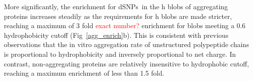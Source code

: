 \documentclass[10pt,letterpaper]{article}
\newcommand{\dSNPs}{dSNPs~}
\newcommand{\grace}[1]{\textcolor{red}{#1}}
\begin{document}
More significantly, the enrichment for \dSNPs in the h blobs of aggregating proteins increases steadily as the requirements for h blobs are made stricter, reaching a maximum of 3 fold \grace{exact number?} enrichment for blobs meeting a 0.6 hydrophobicity cutoff (Fig~\ref{agg_enrich}b).   This is consistent with previous observations that the in vitro aggregation rate of unstructured polypeptide chains is proportional to hydrophobicity and inversely proportional to net charge\cite{DuBay2004}.  In contrast, non-aggregating proteins are relatively insensitive to hydrophobic cutoff, reaching a maximum enrichment of less than 1.5 fold.  






\end{document}

